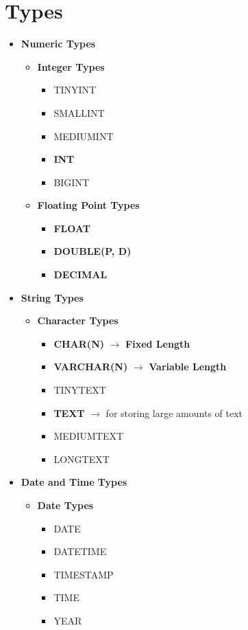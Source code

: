 \documentclass[twoside]{article}
\begin{document}
\section*{Types}
\begin{itemize}
    \item \textbf{Numeric Types}
    \begin{itemize}
        \item \textbf{Integer Types}
        \begin{itemize}
            \item TINYINT
            \item SMALLINT
            \item MEDIUMINT
            \item \textbf{INT}
            \item BIGINT
        \end{itemize}
        \item \textbf{Floating Point Types}
        \begin{itemize}
            \item \textbf{FLOAT}
            \item \textbf{DOUBLE(P, D)}
            \item \textbf{DECIMAL}
        \end{itemize}
    \end{itemize}
    \item \textbf{String Types}
    \begin{itemize}
        \item \textbf{Character Types}
        \begin{itemize}
            \item \textbf{CHAR(N)} $\longrightarrow$ \textbf{Fixed Length}
            \item \textbf{VARCHAR(N)} $\longrightarrow$ \textbf{Variable Length}
            \item TINYTEXT
            \item \textbf{TEXT} $\longrightarrow$ for storing large amounts of text
            \item MEDIUMTEXT
            \item LONGTEXT
        \end{itemize}
    \end{itemize}
    \item \textbf{Date and Time Types}
    \begin{itemize}
        \item \textbf{Date Types}
        \begin{itemize}
            \item DATE
            \item DATETIME
            \item TIMESTAMP
            \item TIME
            \item YEAR
        \end{itemize}
    \end{itemize}
\end{itemize}
\end{document}
